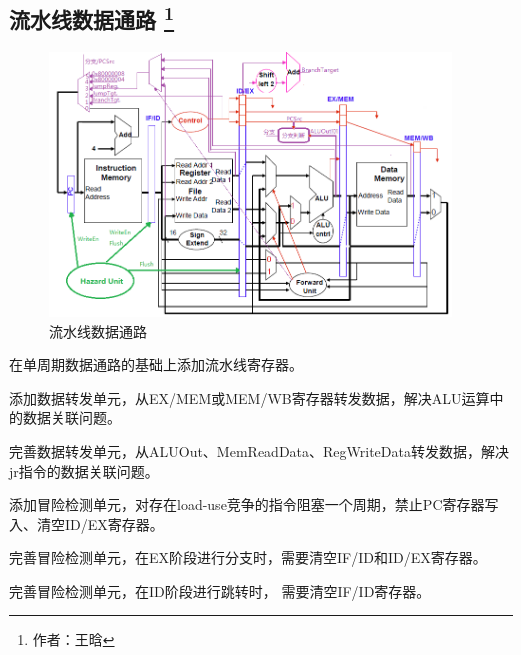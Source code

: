 \documentclass{article}
\begin{document}
        \subsection{流水线数据通路 \protect\footnote{作者：王晗}}
            \begin{figure}[H]
                \centering
                \includegraphics[width=0.95\textwidth]{images/pipeline_datapath.png}
                \caption{\label{fig:pipeline_datapath}流水线数据通路}
            \end{figure}
            \begin{enumerate}
                \begin{item}
                    在单周期数据通路的基础上添加流水线寄存器。
                \end{item}
                \begin{item}
                    添加数据转发单元，从EX/MEM或MEM/WB寄存器转发数据，解决ALU运算中的数据关联问题。
                \end{item}
                \begin{item}
                    完善数据转发单元，从ALUOut、MemReadData、RegWriteData转发数据，解决jr指令的数据关联问题。
                \end{item}
                \begin{item}
                    添加冒险检测单元，对存在load-use竞争的指令阻塞一个周期，禁止PC寄存器写入、清空ID/EX寄存器。
                \end{item}
                \begin{item}
                    完善冒险检测单元，在EX阶段进行分支时，需要清空IF/ID和ID/EX寄存器。
                \end{item}
                \begin{item}
                    完善冒险检测单元，在ID阶段进行跳转时， 需要清空IF/ID寄存器。
                \end{item}
            \end{enumerate}
\end{document}

